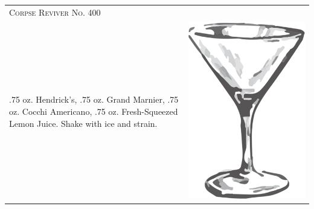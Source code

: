 \documentclass{article}
\begin{document}
\begin{tabular}{p{2in} p{0.5in}}
	\multicolumn{2}{p{3in}}{\centering\Huge\textsc{Corpse Reviver No. 400}}\\ 
	  \vspace{-0.1in}.75 oz. Hendrick's, .75 oz. Grand Marnier, .75 oz. Cocchi Americano, .75 oz. Fresh-Squeezed Lemon Juice. Shake with ice and strain. &
	  \vspace{-0.1in} \includegraphics{goblet.png}
\end{tabular}\\
\end{document}
